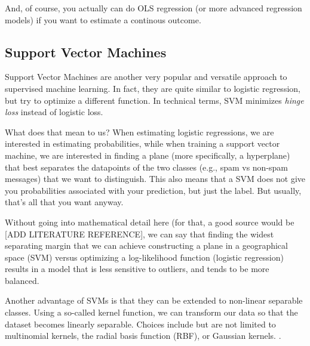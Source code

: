 And, of course, you actually can do OLS regression (or more advanced
regression models) if you want to estimate a continous outcome.







\subsection{Support Vector Machines}
 Support Vector
Machines are another very popular and versatile approach to supervised
machine learning.  In fact, they are quite similar to logistic
regression, but try to optimize a different function. In technical
terms, SVM minimizes \emph{hinge loss} instead of logistic loss.

What does that mean to us? When estimating logistic regressions, we
are interested in estimating probabilities, while when training a
support vector machine, we are interested in finding a plane (more
specifically, a hyperplane) that best separates the datapoints of the
two classes (e.g., spam vs non-spam messages) that we want to
distinguish.  This also means that a SVM does not give you
probabilities associated with your prediction, but just the label.
But usually, that's all that you want anyway.

Without going into mathematical detail here (for that, a good source
would be [ADD LITERATURE REFERENCE], we can say that finding the
widest separating margin that we can achieve constructing a plane in a
geographical space (SVM) versus optimizing a log-likelihood function
(logistic regression) results in a model that is less sensitive to
outliers, and tends to be more balanced.

Another advantage of SVMs is that they can be extended to non-linear
separable classes. Using a so-called kernel function, we can transform
our data so that the dataset becomes linearly separable. Choices
include but are not limited to multinomial kernels, the radial basis
function (RBF), or Gaussian kernels.  .



